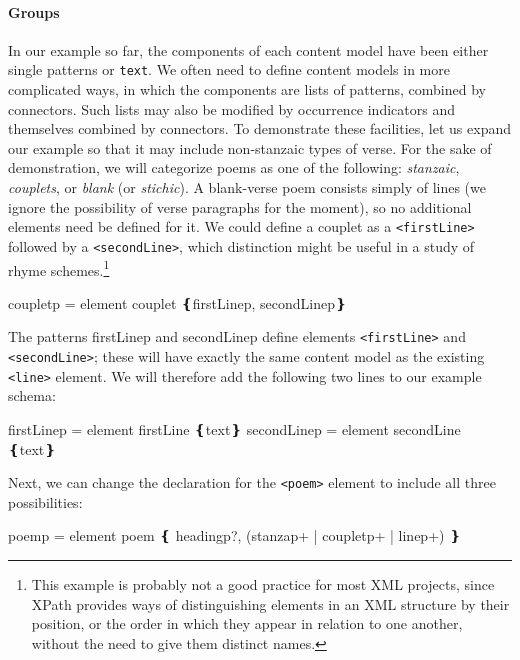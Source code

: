 \paragraph[{Groups}]{Groups}\label{SG146}\par
In our example so far, the components of each content model have been either single patterns or \texttt{text}. We often need to define content models in more complicated ways, in which the components are lists of patterns, combined by connectors. Such lists may also be modified by occurrence indicators and themselves combined by connectors. To demonstrate these facilities, let us expand our example so that it may include non-stanzaic types of verse. For the sake of demonstration, we will categorize poems as one of the following: \textit{stanzaic}, \textit{couplets}, or \textit{blank} (or \textit{stichic}). A blank-verse poem consists simply of lines (we ignore the possibility of verse paragraphs for the moment),  so no additional elements need be defined for it. We could define a couplet as a \texttt{<firstLine>} followed by a \texttt{<secondLine>}, which distinction might be useful in a study of rhyme schemes.\footnote{This example is probably not a good practice for most XML projects, since XPath provides ways of distinguishing elements in an XML structure by their position, or the order in which they appear in relation to one another, without the need to give them distinct names.} \par\hfill\bgroup\exampleFont\vskip 10pt\begin{shaded}
\obeyspaces couplet\textunderscore p = element couplet ❴firstLine\textunderscore p, secondLine\textunderscore p❵\end{shaded}
\par\egroup 
   \par
The patterns firstLine\textunderscore p and secondLine\textunderscore p define elements \texttt{<firstLine>} and \texttt{<secondLine>}; these will have exactly the same content model as the existing \texttt{<line>} element. We will therefore add the following two lines to our example schema: \par\hfill\bgroup\exampleFont\vskip 10pt\begin{shaded}
\obeyspaces firstLine\textunderscore p = element firstLine ❴text❵ secondLine\textunderscore p = element secondLine ❴text❵\end{shaded}
\par\egroup 
 Next, we can change the declaration for the \texttt{<poem>} element to include all three possibilities: \par\hfill\bgroup\exampleFont\vskip 10pt\begin{shaded}
\obeyspaces  poem\textunderscore p = element poem\newline
❴ heading\textunderscore p?, (stanza\textunderscore p+ | couplet\textunderscore p+ | line\textunderscore p+) ❵\end{shaded}
